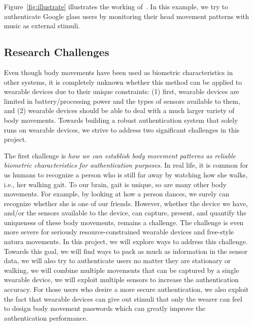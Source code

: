 Figure~\ref{fig:illustrate} illustrates the working of~\systemname. In this example, we try to authenticate Google glass users by monitoring their head movement patterns with music as external stimuli.


\subsection{Research Challenges}
Even though body movements have been used as biometric characteristics in other systems, it is completely unknown whether this method can be applied to wearable devices due to their unique constraints: (1) first, wearable devices are limited in battery/processing power and the types of sensors available to them, and (2) wearable devices should be able to deal with a much larger variety of body movements. Towards building a robust authentication system that solely runs on wearable devices, we strive to address two significant challenges in this project.

The first challenge is \emph{how we can establish body movement patterns as reliable biometric characteristics for authentication purposes.} In real life, it is common for us humans to recognize a person who is still far away by watching how she walks, i.e., her walking gait. To our brain, gait is unique, so are many other body movements. For example, by looking at how a person dances, we surely can recognize whether she is one of our friends.  However, 
whether the device we have, and/or the sensors available to the device, can capture, present, and quantify the uniqueness of these body movements, remains a challenge. The challenge is even more severe for seriously resource-constrained wearable devices and free-style natura movements. In this project, we will explore ways  to address this challenge. Towards this goal, we will find ways to pack as much as information in the sensor data, we will also try to authenticate users no matter they are stationary or walking, we will combine multiple movements that can be captured by a single wearable device, we will exploit multiple sensors to increase the authentication accuracy. For those users who desire a more secure authentication, we also exploit the fact that wearable devices can give out stimuli that only the wearer can feel to design body movement passwords which can greatly improve the authentication performance.

